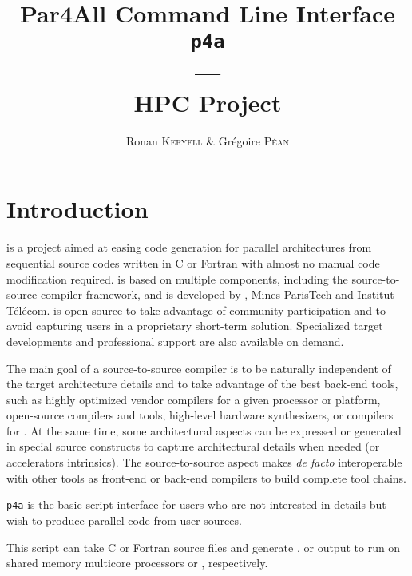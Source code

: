\documentclass[a4paper]{article}
\begin{document}
\title{Par4All Command Line Interface\\
  \texttt{p4a}\\
  ---\\
  HPC Project}

\author{Ronan \textsc{Keryell} \& Grégoire \textsc{Péan}}

\maketitle

\tableofcontents{}



\section{Introduction}
\label{sec:introduction}

\Apfa is a project aimed at easing code generation for parallel
architectures from sequential source codes written in C or Fortran with
almost no manual code modification required. \Apfa is based on multiple
components, including the \Apips source-to-source compiler framework, and is
developed by \Ahpcp, Mines ParisTech and Institut Télécom. \Apfa is
open source to take advantage of community participation and to avoid
capturing users in a proprietary short-term solution. Specialized target
developments and professional support are also available on demand.

The main goal of a source-to-source compiler is to be naturally
independent of the target architecture details and to take advantage
of the best
back-end tools, such as highly optimized vendor compilers for a given
processor or platform, open-source compilers and tools, high-level
hardware synthesizers, \Acuda or \Aopencl compilers for \Agpu. At the same
time, some architectural aspects can be expressed or generated in
special source constructs to capture architectural details when needed
(\Asimd or accelerators intrinsics). The source-to-source aspect makes
\Apfa \emph{de facto} interoperable with other tools as front-end
or back-end compilers to build complete tool chains.

\texttt{p4a} is the basic script interface for users who are
not interested in \Apips details but wish to produce parallel code from
user sources.

This script can take C or Fortran source files and generate \Aopenmp,
\Acuda or \Aopencl output to run on shared memory multicore processors or
\Agpu, respectively.
\end{document}
